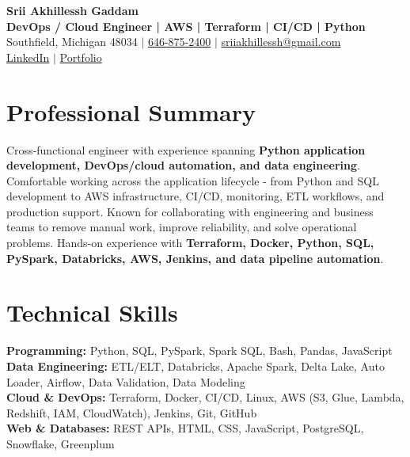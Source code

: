 \documentclass[letterpaper,10pt]{article}
\begin{document}
\fontsize{9.35pt}{10.45pt}\selectfont

\begin{center}
    {\LARGE \textbf{Srii Akhillessh Gaddam}} \\[-1pt]
    \textbf{DevOps / Cloud Engineer | AWS | Terraform | CI/CD | Python} \\[2pt]
    Southfield, Michigan 48034 $|$
    \href{tel:6468752400}{646-875-2400} $|$
    \href{mailto:sriiakhillessh@gmail.com}{sriiakhillessh@gmail.com} \\[1pt]
    \href{https://www.linkedin.com/in/srii-akhiilessh-gaddam-b48668191/}{LinkedIn} $|$
    \href{https://sriiakhillesshg.github.io/portfolio/}{Portfolio}
\end{center}
\vspace{-8pt}

\section{Professional Summary}
\small{Cross-functional engineer with experience spanning \textbf{Python application development, DevOps/cloud automation, and data engineering}. Comfortable working across the application lifecycle - from Python and SQL development to AWS infrastructure, CI/CD, monitoring, ETL workflows, and production support. Known for collaborating with engineering and business teams to remove manual work, improve reliability, and solve operational problems. Hands-on experience with \textbf{Terraform, Docker, Python, SQL, PySpark, Databricks, AWS, Jenkins, and data pipeline automation}.}

\section{Technical Skills}
\small{
\textbf{Programming:} Python, SQL, PySpark, Spark SQL, Bash, Pandas, JavaScript \\
\textbf{Data Engineering:} ETL/ELT, Databricks, Apache Spark, Delta Lake, Auto Loader, Airflow, Data Validation, Data Modeling \\
\textbf{Cloud \& DevOps:} Terraform, Docker, CI/CD, Linux, AWS (S3, Glue, Lambda, Redshift, IAM, CloudWatch), Jenkins, Git, GitHub \\
\textbf{Web \& Databases:} REST APIs, HTML, CSS, JavaScript, PostgreSQL, Snowflake, Greenplum
}
\end{document}
